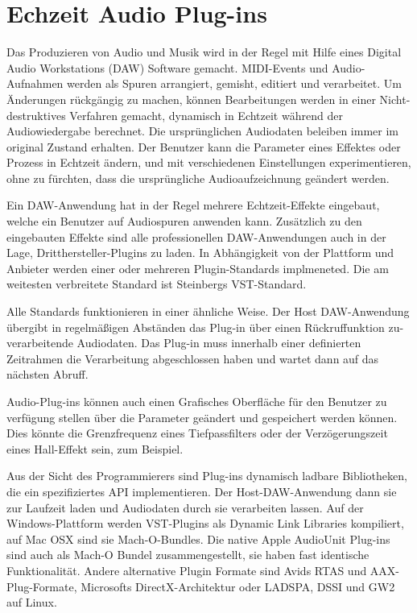 \section{Echzeit Audio Plug-ins}

Das Produzieren von Audio und Musik wird in der Regel mit Hilfe eines Digital Audio Workstations (DAW) Software gemacht. MIDI-Events und Audio-Aufnahmen werden als Spuren arrangiert, gemisht, editiert und verarbeitet. Um Änderungen rückgängig zu machen, können Bearbeitungen werden in einer Nicht-destruktives Verfahren gemacht, dynamisch in Echtzeit während der Audiowiedergabe berechnet. Die ursprünglichen Audiodaten beleiben immer im original Zustand erhalten. Der Benutzer kann die Parameter eines Effektes oder Prozess in Echtzeit ändern, und mit verschiedenen Einstellungen experimentieren, ohne zu fürchten, dass die ursprüngliche Audioaufzeichnung geändert werden.

Ein DAW-Anwendung hat in der Regel mehrere Echtzeit-Effekte eingebaut, welche ein Benutzer auf Audiospuren anwenden kann. Zusätzlich zu den eingebauten Effekte sind alle professionellen DAW-Anwendungen auch in der Lage, Dritthersteller-Plugins zu laden. In Abhängigkeit von der Plattform und Anbieter werden einer oder mehreren Plugin-Standards implmeneted. Die am weitesten verbreitete Standard ist Steinbergs VST-Standard.

Alle Standards funktionieren in einer ähnliche Weise. Der Host DAW-Anwendung übergibt in regelmäßigen Abständen das Plug-in über einen Rückruffunktion zu-verarbeitende Audiodaten. Das Plug-in muss innerhalb einer definierten Zeitrahmen die Verarbeitung abgeschlossen haben und wartet dann auf das nächsten Abruff.

Audio-Plug-ins können auch einen Grafisches Oberfläche für den Benutzer zu verfügung stellen über die Parameter geändert und gespeichert werden können. Dies könnte die Grenzfrequenz eines Tiefpassfilters oder der Verzögerungszeit eines Hall-Effekt sein, zum Beispiel.

Aus der Sicht des Programmierers sind Plug-ins dynamisch ladbare Bibliotheken, die ein spezifiziertes API implementieren. Der Host-DAW-Anwendung dann sie zur Laufzeit laden und Audiodaten durch sie verarbeiten lassen\cite{realtime-architectures}. Auf der Windows-Plattform werden VST-Plugins als Dynamic Link Libraries kompiliert, auf Mac OSX sind sie Mach-O-Bundles. Die native Apple AudioUnit Plug-ins sind auch als Mach-O Bundel zusammengestellt, sie haben fast identische Funktionalität. Andere alternative Plugin Formate sind Avids RTAS und AAX-Plug-Formate, Microsofts DirectX-Architektur oder LADSPA, DSSI und GW2 auf Linux.

